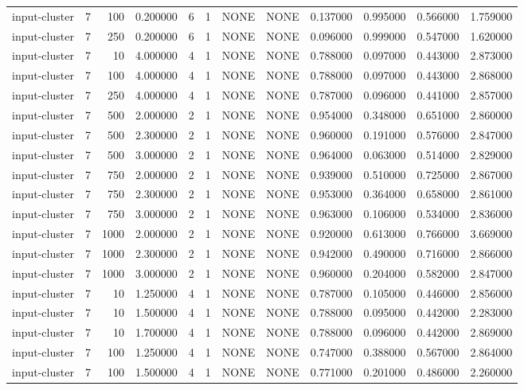 \begin{tabular}{lrrrllllrrrr}
input-cluster & 7 & 100 & 0.200000 & 6 & 1 & NONE & NONE & 0.137000 & 0.995000 & 0.566000 & 1.759000 \\
input-cluster & 7 & 250 & 0.200000 & 6 & 1 & NONE & NONE & 0.096000 & 0.999000 & 0.547000 & 1.620000 \\
input-cluster & 7 & 10 & 4.000000 & 4 & 1 & NONE & NONE & 0.788000 & 0.097000 & 0.443000 & 2.873000 \\
input-cluster & 7 & 100 & 4.000000 & 4 & 1 & NONE & NONE & 0.788000 & 0.097000 & 0.443000 & 2.868000 \\
input-cluster & 7 & 250 & 4.000000 & 4 & 1 & NONE & NONE & 0.787000 & 0.096000 & 0.441000 & 2.857000 \\
input-cluster & 7 & 500 & 2.000000 & 2 & 1 & NONE & NONE & 0.954000 & 0.348000 & 0.651000 & 2.860000 \\
input-cluster & 7 & 500 & 2.300000 & 2 & 1 & NONE & NONE & 0.960000 & 0.191000 & 0.576000 & 2.847000 \\
input-cluster & 7 & 500 & 3.000000 & 2 & 1 & NONE & NONE & 0.964000 & 0.063000 & 0.514000 & 2.829000 \\
input-cluster & 7 & 750 & 2.000000 & 2 & 1 & NONE & NONE & 0.939000 & 0.510000 & 0.725000 & 2.867000 \\
input-cluster & 7 & 750 & 2.300000 & 2 & 1 & NONE & NONE & 0.953000 & 0.364000 & 0.658000 & 2.861000 \\
input-cluster & 7 & 750 & 3.000000 & 2 & 1 & NONE & NONE & 0.963000 & 0.106000 & 0.534000 & 2.836000 \\
input-cluster & 7 & 1000 & 2.000000 & 2 & 1 & NONE & NONE & 0.920000 & 0.613000 & 0.766000 & 3.669000 \\
input-cluster & 7 & 1000 & 2.300000 & 2 & 1 & NONE & NONE & 0.942000 & 0.490000 & 0.716000 & 2.866000 \\
input-cluster & 7 & 1000 & 3.000000 & 2 & 1 & NONE & NONE & 0.960000 & 0.204000 & 0.582000 & 2.847000 \\
input-cluster & 7 & 10 & 1.250000 & 4 & 1 & NONE & NONE & 0.787000 & 0.105000 & 0.446000 & 2.856000 \\
input-cluster & 7 & 10 & 1.500000 & 4 & 1 & NONE & NONE & 0.788000 & 0.095000 & 0.442000 & 2.283000 \\
input-cluster & 7 & 10 & 1.700000 & 4 & 1 & NONE & NONE & 0.788000 & 0.096000 & 0.442000 & 2.869000 \\
input-cluster & 7 & 100 & 1.250000 & 4 & 1 & NONE & NONE & 0.747000 & 0.388000 & 0.567000 & 2.864000 \\
input-cluster & 7 & 100 & 1.500000 & 4 & 1 & NONE & NONE & 0.771000 & 0.201000 & 0.486000 & 2.260000 \\

\end{tabular}
